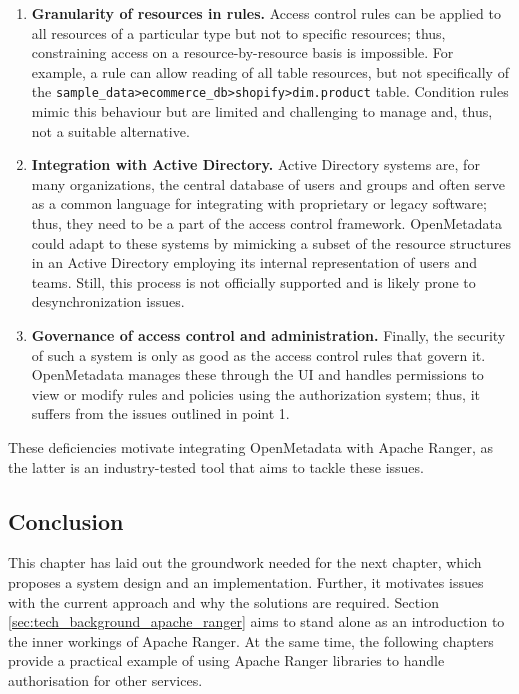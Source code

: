 \begin{enumerate}

    \item \textbf{Granularity of resources in rules.} Access control rules can be applied to all resources of a particular type but not to specific resources; thus, constraining access on a resource-by-resource basis is impossible. For example, a rule can allow reading of all table resources, but not specifically of the \texttt{sample_data>ecommerce_db>shopify>dim.product} table. Condition rules mimic this behaviour but are limited and challenging to manage and, thus, not a suitable alternative.

    \item \textbf{Integration with Active Directory.} Active Directory systems are, for many organizations, the central database of users and groups and often serve as a common language for integrating with proprietary or legacy software; thus, they need to be a part of the access control framework. OpenMetadata could adapt to these systems by mimicking a subset of the resource structures in an Active Directory employing its internal representation of users and teams. Still, this process is not officially supported and is likely prone to desynchronization issues.

    \item \textbf{Governance of access control and administration.} Finally, the security of such a system is only as good as the access control rules that govern it. OpenMetadata manages these through the UI and handles permissions to view or modify rules and policies using the authorization system; thus, it suffers from the issues outlined in point 1.

\end{enumerate}

These deficiencies motivate integrating OpenMetadata with Apache Ranger, as the latter is an industry-tested tool that aims to tackle these issues.

\subsection{Conclusion}

This chapter has laid out the groundwork needed for the next chapter, which proposes a system design and an implementation. Further, it motivates issues with the current approach and why the solutions are required. Section \ref{sec:tech_background_apache_ranger} aims to stand alone as an introduction to the inner workings of Apache Ranger. At the same time, the following chapters provide a practical example of using Apache Ranger libraries to handle authorisation for other services.